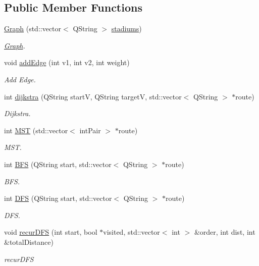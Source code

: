 \subsection*{Public Member Functions}
\begin{DoxyCompactItemize}
\item 
\hyperlink{class_graph_a30ad544c1ac7ffca896c4f9e3482e4b2}{Graph} (std\+::vector$<$ Q\+String $>$ \hyperlink{class_graph_a90ae3fa378893d9cc43473597defbb3a}{stadiums})
\begin{DoxyCompactList}\small\item\em \hyperlink{class_graph}{Graph}. \end{DoxyCompactList}\item 
void \hyperlink{class_graph_aba11741e1190c29cea65db0c88cb8e9a}{add\+Edge} (int v1, int v2, int weight)
\begin{DoxyCompactList}\small\item\em Add Edge. \end{DoxyCompactList}\item 
int \hyperlink{class_graph_af88e687c2cefcdad584a64f52c98824e}{dijkstra} (Q\+String startV, Q\+String targetV, std\+::vector$<$ Q\+String $>$ $\ast$route)
\begin{DoxyCompactList}\small\item\em Dijkstra. \end{DoxyCompactList}\item 
int \hyperlink{class_graph_a24e43f7f7958bf9edd53f170623266ec}{M\+ST} (std\+::vector$<$ int\+Pair $>$ $\ast$route)
\begin{DoxyCompactList}\small\item\em M\+ST. \end{DoxyCompactList}\item 
int \hyperlink{class_graph_a97dda4b96f3b3b07cfcb95461fc6bd9b}{B\+FS} (Q\+String start, std\+::vector$<$ Q\+String $>$ $\ast$route)
\begin{DoxyCompactList}\small\item\em B\+FS. \end{DoxyCompactList}\item 
int \hyperlink{class_graph_ad724e3eb5c87319985f9c4bb1ca8ee1e}{D\+FS} (Q\+String start, std\+::vector$<$ Q\+String $>$ $\ast$route)
\begin{DoxyCompactList}\small\item\em D\+FS. \end{DoxyCompactList}\item 
void \hyperlink{class_graph_a629a3606307c13695d9375a27ccb41ff}{recur\+D\+FS} (int start, bool $\ast$visited, std\+::vector$<$ int $>$ \&order, int dist, int \&total\+Distance)
\begin{DoxyCompactList}\small\item\em recur\+D\+FS \end{DoxyCompactList}\end{DoxyCompactItemize}
